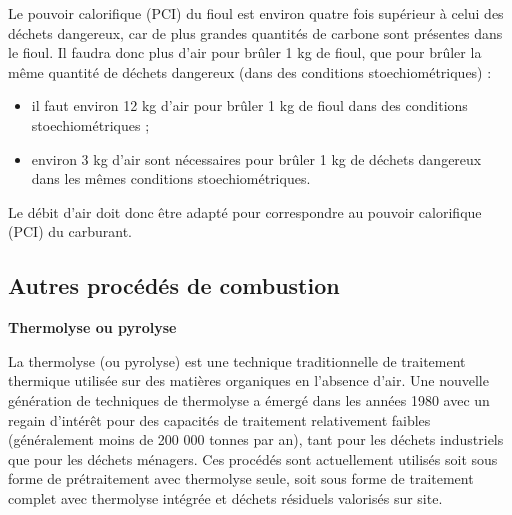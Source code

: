 Le pouvoir calorifique (PCI) du fioul est environ quatre fois supérieur à celui des déchets dangereux, car de plus grandes quantités de carbone sont présentes dans le fioul. Il faudra donc plus d'air pour brûler 1 kg de fioul, que pour brûler la même quantité de déchets dangereux (dans des conditions stoechiométriques) :
\begin{itemize}
    \item il faut environ 12 kg d'air pour brûler 1 kg de fioul dans des conditions stoechiométriques ;
    \item environ 3 kg d'air sont nécessaires pour brûler 1 kg de déchets dangereux dans les mêmes conditions stoechiométriques.
\end{itemize}

Le débit d'air doit donc être adapté pour correspondre au pouvoir calorifique (PCI) du carburant.


\subsection{Autres procédés de combustion}

\textbf{Thermolyse ou pyrolyse}
\vspace{0.3cm}

La thermolyse (ou pyrolyse) est une technique traditionnelle de traitement thermique utilisée sur des matières organiques en l'absence d'air. Une nouvelle génération de techniques de thermolyse a émergé dans les années 1980 avec un regain d'intérêt pour des capacités de traitement relativement faibles (généralement moins de 200 000 tonnes par an), tant pour les déchets industriels que pour les déchets ménagers. Ces procédés sont actuellement utilisés soit sous forme de prétraitement avec thermolyse seule, soit sous forme de traitement complet avec thermolyse intégrée et déchets résiduels valorisés sur site.

